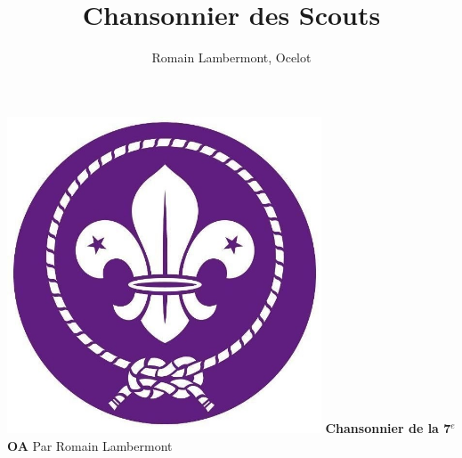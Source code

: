 \documentclass[13pt,a5paper, twocolumn]{article}
\title{Chansonnier des Scouts}
\author{Romain Lambermont, Ocelot}
\date{}
\begin{document}
\begin{titlepage}
    \centering
    \vspace{3cm}
    \vspace{3cm}
    \includegraphics[width=0.7\textwidth]{logo.jpg}
    \huge\textbf{Chansonnier de la 7$^e$ OA}
    \vfill
    \Large Par Romain Lambermont
\end{titlepage}

\renewcommand{\contentsname}{Table des matières}
\tableofcontents
\clearpage
































\end{document}
